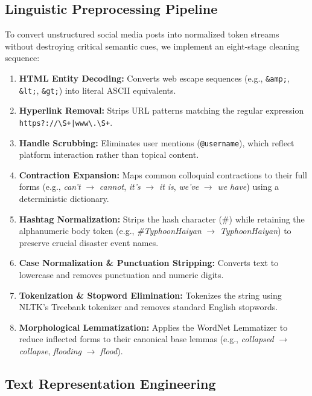 \documentclass[11pt,a4paper]{article}
\begin{document}
\subsection{Linguistic Preprocessing Pipeline}
\label{sec:preprocessing}
To convert unstructured social media posts into normalized token streams without destroying critical semantic cues, we implement an eight-stage cleaning sequence:
\begin{enumerate}
    \item \textbf{HTML Entity Decoding:} Converts web escape sequences (e.g., \texttt{\&amp;}, \texttt{\&lt;}, \texttt{\&gt;}) into literal ASCII equivalents.
    \item \textbf{Hyperlink Removal:} Strips URL patterns matching the regular expression \texttt{https?://\textbackslash S+|www\textbackslash .\textbackslash S+}.
    \item \textbf{Handle Scrubbing:} Eliminates user mentions (\texttt{@username}), which reflect platform interaction rather than topical content.
    \item \textbf{Contraction Expansion:} Maps common colloquial contractions to their full forms (e.g., \textit{can't} $\rightarrow$ \textit{cannot}, \textit{it's} $\rightarrow$ \textit{it is}, \textit{we've} $\rightarrow$ \textit{we have}) using a deterministic dictionary.
    \item \textbf{Hashtag Normalization:} Strips the hash character (\#) while retaining the alphanumeric body token (e.g., \textit{\#TyphoonHaiyan} $\rightarrow$ \textit{TyphoonHaiyan}) to preserve crucial disaster event names.
    \item \textbf{Case Normalization & Punctuation Stripping:} Converts text to lowercase and removes punctuation and numeric digits.
    \item \textbf{Tokenization & Stopword Elimination:} Tokenizes the string using NLTK's Treebank tokenizer and removes standard English stopwords.
    \item \textbf{Morphological Lemmatization:} Applies the WordNet Lemmatizer to reduce inflected forms to their canonical base lemmas (e.g., \textit{collapsed} $\rightarrow$ \textit{collapse}, \textit{flooding} $\rightarrow$ \textit{flood}).
\end{enumerate}

\subsection{Text Representation Engineering}
\label{sec:representations}
\end{document}
